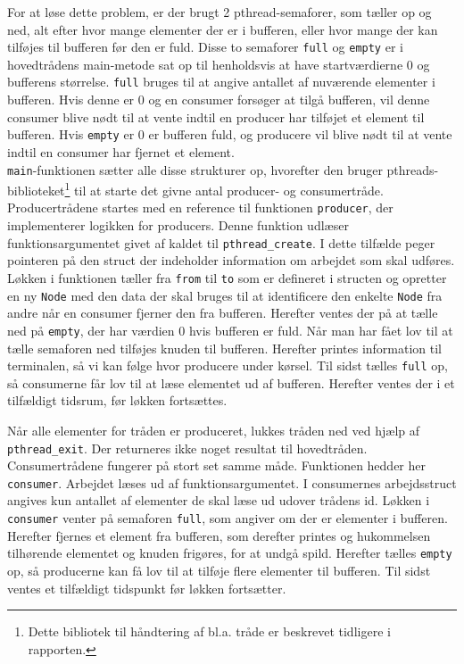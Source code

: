 For at løse dette problem, er der brugt 2 pthread-semaforer, som tæller op og ned, alt efter hvor mange elementer der er i bufferen, eller hvor mange der kan tilføjes til bufferen før den er fuld. Disse to semaforer \texttt{full} og \texttt{empty} er i hovedtrådens main-metode sat op til henholdsvis at have startværdierne 0 og bufferens størrelse. \texttt{full} bruges til at angive antallet af nuværende elementer i bufferen. Hvis denne er 0 og en consumer forsøger at tilgå bufferen, vil denne consumer blive nødt til at vente indtil en producer har tilføjet et element til bufferen. Hvis \texttt{empty} er 0 er bufferen fuld, og producere vil blive nødt til at vente indtil en consumer har fjernet et element.\\

\texttt{main}-funktionen sætter alle disse strukturer op, hvorefter den bruger pthreads-biblioteket\footnote{Dette bibliotek til håndtering af bl.a. tråde er beskrevet tidligere i rapporten.} til at starte det givne antal producer- og consumertråde.\\

Producertrådene startes med en reference til funktionen \texttt{producer}, der implementerer logikken for producers. Denne funktion udlæser funktionsargumentet givet af kaldet til \texttt{pthread\_create}. I dette tilfælde peger pointeren på den struct der indeholder information om arbejdet som skal udføres. Løkken i funktionen tæller fra \texttt{from} til \texttt{to} som er defineret i structen og opretter en ny \texttt{Node} med den data der skal bruges til at identificere den enkelte \texttt{Node} fra andre når en consumer fjerner den fra bufferen. Herefter ventes der på at tælle ned på \texttt{empty}, der har værdien 0 hvis bufferen er fuld. Når man har fået lov til at tælle semaforen ned tilføjes knuden til bufferen. Herefter printes information til terminalen, så vi kan følge hvor producere under kørsel. Til sidst tælles \texttt{full} op, så consumerne får lov til at læse elementet ud af bufferen. Herefter ventes der i et tilfældigt tidsrum, før løkken fortsættes.

Når alle elementer for tråden er produceret, lukkes tråden ned ved hjælp af \texttt{pthread\_exit}. Der returneres ikke noget resultat til hovedtråden.\\

Consumertrådene fungerer på stort set samme måde. Funktionen hedder her \texttt{consumer}. Arbejdet læses ud af funktionsargumentet. I consumernes arbejdsstruct angives kun antallet af elementer de skal læse ud udover trådens id. Løkken i \texttt{consumer} venter på semaforen \texttt{full}, som angiver om der er elementer i bufferen. Herefter fjernes et element fra bufferen, som derefter printes og hukommelsen tilhørende elementet og knuden frigøres, for at undgå spild. Herefter tælles \texttt{empty} op, så producerne kan få lov til at tilføje flere elementer til bufferen. Til sidst ventes et tilfældigt tidspunkt før løkken fortsætter.

